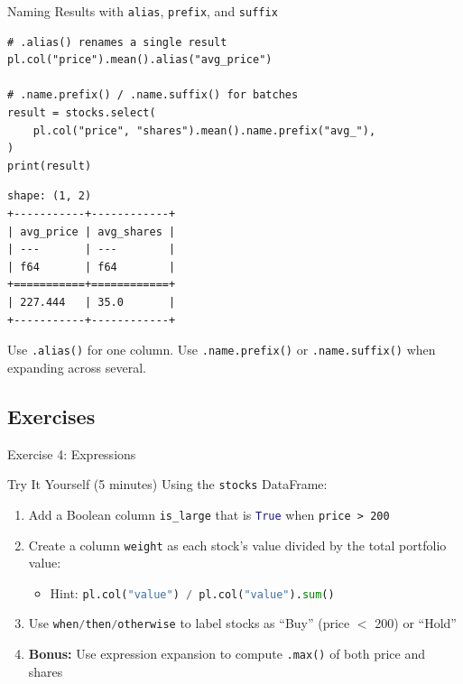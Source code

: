 \documentclass[9pt,aspectratio=169]{beamer}
\newcommand{\py}[1]{\lstinline[language=Python]{#1}}
\begin{document}
\begin{frame}[fragile]{Naming Results with \texttt{alias}, \texttt{prefix}, and \texttt{suffix}}

\begin{lstlisting}
# .alias() renames a single result
pl.col("price").mean().alias("avg_price")

# .name.prefix() / .name.suffix() for batches
result = stocks.select(
    pl.col("price", "shares").mean().name.prefix("avg_"),
)
print(result)
\end{lstlisting}

\begin{lstlisting}[style=output]
shape: (1, 2)
+-----------+------------+
| avg_price | avg_shares |
| ---       | ---        |
| f64       | f64        |
+===========+============+
| 227.444   | 35.0       |
+-----------+------------+
\end{lstlisting}

\begin{highlightbox}
\centering
Use \texttt{.alias()} for one column. Use \texttt{.name.prefix()} or \texttt{.name.suffix()} when expanding across several.
\end{highlightbox}

\end{frame}


\subsection{Exercises}
\begin{frame}[fragile]{Exercise 4: Expressions}

\begin{alertblock}{Try It Yourself (5 minutes)}
Using the \texttt{stocks} DataFrame:
\begin{enumerate}
    \item Add a Boolean column \texttt{is\_large} that is \py{True} when \texttt{price > 200}
    \item Create a column \texttt{weight} as each stock's value divided by the total portfolio value:
    \begin{itemize}
        \item Hint: \py{pl.col("value") / pl.col("value").sum()}
    \end{itemize}
    \item Use \py{when/then/otherwise} to label stocks as ``Buy'' (price $<$ 200) or ``Hold''
    \item \textbf{Bonus:} Use expression expansion to compute \texttt{.max()} of both price and shares
\end{enumerate}
\end{alertblock}

\end{frame}
\end{document}
